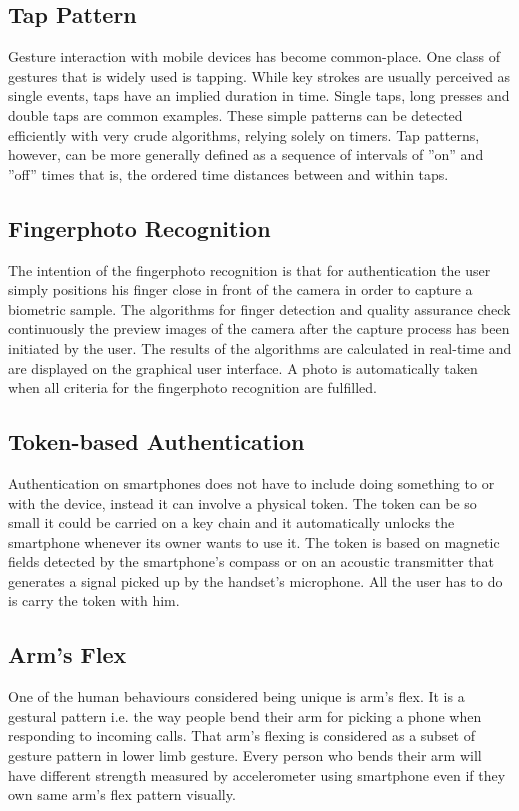\subsection{Tap Pattern}
Gesture interaction with mobile devices has become common-place. One class of gestures that is widely used is tapping. While key strokes are usually perceived as single events, taps have an implied duration in time. Single taps, long presses and double taps are common examples. These simple patterns can be detected efficiently with very crude algorithms, relying solely on timers. Tap patterns, however, can be more generally defined as a sequence of intervals of ''on'' and ''off'' times that is, the ordered time distances between and within taps. \cite{marques2013under}

\subsection{Fingerphoto Recognition}
The intention of the fingerphoto recognition is that for authentication the user simply positions his finger close in front of the camera in order to capture a biometric sample. The algorithms for finger detection and quality assurance check continuously the preview images of the camera after the capture process has been initiated by the user. The results of the algorithms are calculated in real-time and are displayed on the graphical user interface. A photo is automatically taken when all criteria for the fingerphoto recognition are fulfilled. \cite{stein2012fingerphoto}

\subsection{Token-based Authentication}
Authentication on smartphones does not have to include doing something to or with the device, instead it can involve a physical token. The token can be so small it could be carried on a key chain and it automatically unlocks the smartphone whenever its owner wants to use it. The token is based on magnetic fields detected by the smartphone's compass or on an acoustic transmitter that generates a signal picked up by the handset's microphone. All the user has to do is carry the token with him. \cite{bojinov2011mobile}

\subsection{Arm's Flex}
One of the human behaviours considered being unique is arm's flex. It is a gestural pattern i.e. the way people bend their arm for picking a phone when responding to incoming calls. That arm's flexing is considered as a subset of gesture pattern in lower limb gesture. Every person who bends their arm will have different strength measured by accelerometer using smartphone even if they own same arm's flex pattern visually.\cite{negara2012arm, srirama2011zompopo}

